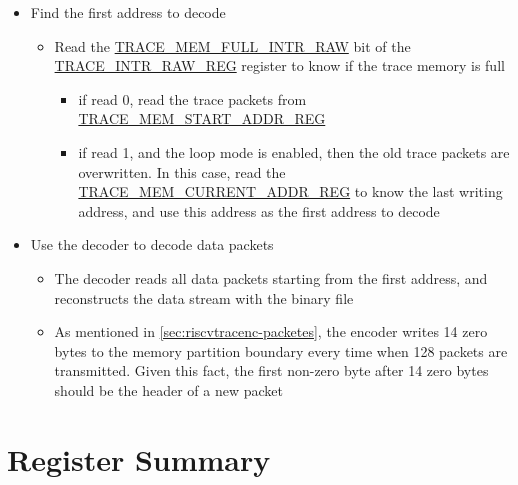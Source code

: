 \documentclass[main\_\_EN.tex]{subfiles}
\begin{document}
\begin{itemize}
    \item Find the first address to decode
        \begin{itemize}
            \item Read the \hyperref[fielddesc:TRACEMEMFULLINTRRAW]{TRACE\_MEM\_FULL\_INTR\_RAW} bit of the \hyperref[regdesc:TRACEINTRRAWREG]{TRACE\_INTR\_RAW\_REG} register to know if the trace memory is full
            \begin{itemize}
                \item if read 0, read the trace packets from \hyperref[regdesc:TRACEMEMSTARTADDRREG]{TRACE\_MEM\_START\_ADDR\_REG}
                \item if read 1, and the loop mode is enabled, then the old trace packets are overwritten. In this case, read the \hyperref[regdesc:TRACEMEMCURRENTADDRREG]{TRACE\_MEM\_CURRENT\_ADDR\_REG} to know the last writing address, and use this address as the first address to decode
            \end{itemize}
        \end{itemize}

    \item Use the decoder to decode data packets
        \begin{itemize}
            \item The decoder reads all data packets starting from the first address, and reconstructs the data stream with the binary file
            \item As mentioned in \ref{sec:riscvtracenc-packetes}, the encoder writes 14 zero bytes to the memory partition boundary every time when 128 packets are transmitted. Given this fact, the first non-zero byte after 14 zero bytes should be the header of a new packet
        \end{itemize}
\end{itemize}








\clearpage
\hypertarget{riscvtracenc-reg-summ}{}
\section{Register Summary}
\label{sec:riscvtracenc-reg-summ}
\end{document}
